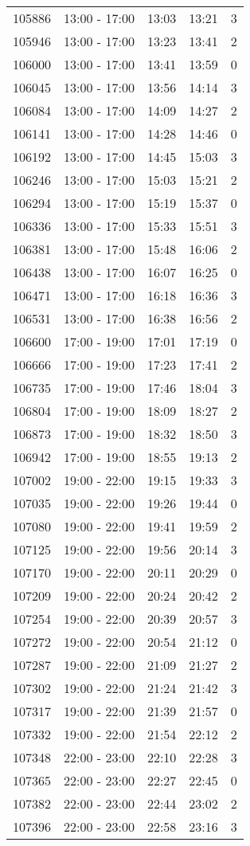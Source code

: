 \documentclass{article}
\begin{document}
\begin{tabular}{llccc}
105886 & 13:00 - 17:00 & 13:03 & 13:21 & 3 \\
105946 & 13:00 - 17:00 & 13:23 & 13:41 & 2 \\
106000 & 13:00 - 17:00 & 13:41 & 13:59 & 0 \\
106045 & 13:00 - 17:00 & 13:56 & 14:14 & 3 \\
106084 & 13:00 - 17:00 & 14:09 & 14:27 & 2 \\
106141 & 13:00 - 17:00 & 14:28 & 14:46 & 0 \\
106192 & 13:00 - 17:00 & 14:45 & 15:03 & 3 \\
106246 & 13:00 - 17:00 & 15:03 & 15:21 & 2 \\
106294 & 13:00 - 17:00 & 15:19 & 15:37 & 0 \\
106336 & 13:00 - 17:00 & 15:33 & 15:51 & 3 \\
106381 & 13:00 - 17:00 & 15:48 & 16:06 & 2 \\
106438 & 13:00 - 17:00 & 16:07 & 16:25 & 0 \\
106471 & 13:00 - 17:00 & 16:18 & 16:36 & 3 \\
106531 & 13:00 - 17:00 & 16:38 & 16:56 & 2 \\
106600 & 17:00 - 19:00 & 17:01 & 17:19 & 0 \\
106666 & 17:00 - 19:00 & 17:23 & 17:41 & 2 \\
106735 & 17:00 - 19:00 & 17:46 & 18:04 & 3 \\
106804 & 17:00 - 19:00 & 18:09 & 18:27 & 2 \\
106873 & 17:00 - 19:00 & 18:32 & 18:50 & 3 \\
106942 & 17:00 - 19:00 & 18:55 & 19:13 & 2 \\
107002 & 19:00 - 22:00 & 19:15 & 19:33 & 3 \\
107035 & 19:00 - 22:00 & 19:26 & 19:44 & 0 \\
107080 & 19:00 - 22:00 & 19:41 & 19:59 & 2 \\
107125 & 19:00 - 22:00 & 19:56 & 20:14 & 3 \\
107170 & 19:00 - 22:00 & 20:11 & 20:29 & 0 \\
107209 & 19:00 - 22:00 & 20:24 & 20:42 & 2 \\
107254 & 19:00 - 22:00 & 20:39 & 20:57 & 3 \\
107272 & 19:00 - 22:00 & 20:54 & 21:12 & 0 \\
107287 & 19:00 - 22:00 & 21:09 & 21:27 & 2 \\
107302 & 19:00 - 22:00 & 21:24 & 21:42 & 3 \\
107317 & 19:00 - 22:00 & 21:39 & 21:57 & 0 \\
107332 & 19:00 - 22:00 & 21:54 & 22:12 & 2 \\
107348 & 22:00 - 23:00 & 22:10 & 22:28 & 3 \\
107365 & 22:00 - 23:00 & 22:27 & 22:45 & 0 \\
107382 & 22:00 - 23:00 & 22:44 & 23:02 & 2 \\
107396 & 22:00 - 23:00 & 22:58 & 23:16 & 3 \\
\bottomrule
\end{tabular}
\end{document}
